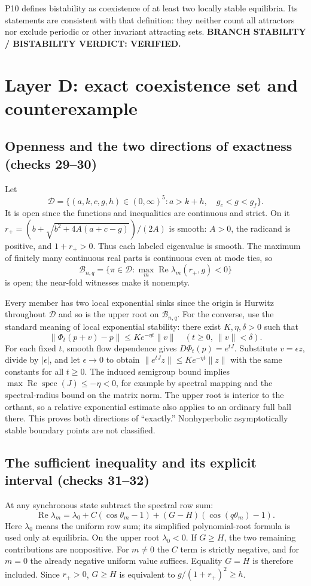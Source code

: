 \documentclass[11pt]{article}
\newcommand{\Ree}{\operatorname{Re}}
\newcommand{\norm}[1]{\lVert#1\rVert}
\begin{document}
P10 defines bistability as coexistence of at least two locally stable
equilibria. Its statements are consistent with that definition: they neither
count all attractors nor exclude periodic or other invariant attracting sets.
\textbf{BRANCH STABILITY / BISTABILITY VERDICT: VERIFIED.}

\section{Layer D: exact coexistence set and counterexample}
\label{sec:D}
\subsection{Openness and the two directions of exactness (checks 29--30)}
Let
\[
 \mathcal D=\{(a,k,c,g,h)\in(0,\infty)^5:
                  a>k+h,\quad g_c<g<g_f\}.
\]
It is open since the functions and inequalities are continuous and strict.
On it $r_+=(b+\sqrt{b^2+4A(a+c-g)})/(2A)$ is smooth: $A>0$, the
radicand is positive, and $1+r_+>0$. Thus each labeled eigenvalue is smooth.
The maximum of finitely many continuous real parts is continuous even at
mode ties, so
\[
 \mathcal B_{n,q}=\{\pi\in\mathcal D:
                 \max_m\Ree\lambda_m(r_+,g)<0\}
\]
is open; the near-fold witnesses make it nonempty.

Every member has two local exponential sinks since the origin is Hurwitz
throughout $\mathcal D$ and so is the upper root on $\mathcal B_{n,q}$.
For the converse, use the standard meaning of local exponential stability:
there exist $K,\eta,\delta>0$ such that
\[
 \norm{\Phi_t(p+v)-p}\le K e^{-\eta t}\norm v
 \quad(t\ge0,\ \norm v<\delta).
\]
For each fixed $t$, smooth flow dependence gives
$D\Phi_t(p)=e^{tJ}$. Substitute $v=\epsilon z$, divide by $|\epsilon|$,
and let $\epsilon\to0$ to obtain
$\norm{e^{tJ}z}\le K e^{-\eta t}\norm z$ with the same constants for all
$t\ge0$. The induced semigroup bound implies
$\max\Ree\operatorname{spec}(J)\le-\eta<0$, for example by spectral
mapping and the spectral-radius bound on the matrix norm. The upper root is
interior to the orthant, so a relative exponential estimate also applies to
an ordinary full ball there. This proves both directions of ``exactly.''
Nonhyperbolic asymptotically stable boundary points are not classified.

\subsection{The sufficient inequality and its explicit interval (checks 31--32)}
At any synchronous state subtract the spectral row sum:
\[
 \Ree\lambda_m=\lambda_0+C(\cos\theta_m-1)
                         +(G-H)(\cos(q\theta_m)-1).
\]
Here $\lambda_0$ means the uniform row sum; its simplified polynomial-root
formula is used only at equilibria. On the upper root $\lambda_0<0$.
If $G\ge H$, the two remaining contributions are nonpositive. For $m\ne0$
the $C$ term is strictly negative, and for $m=0$ the already negative uniform
value suffices. Equality $G=H$ is therefore included. Since $r_+>0$,
$G\ge H$ is equivalent to $g/(1+r_+)^2\ge h$.
\end{document}
